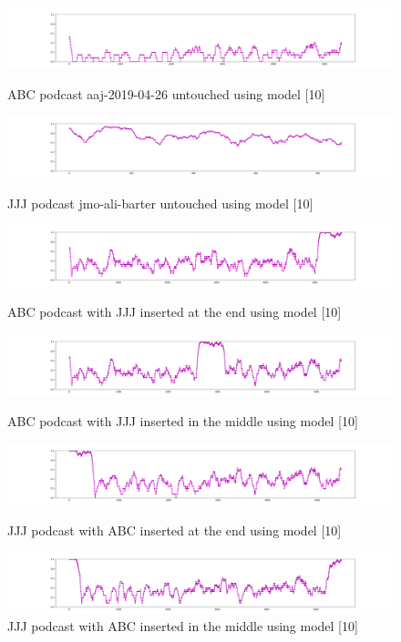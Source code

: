 \begin{figure}[b!]
\begin{center}

\includegraphics[scale=0.2]{src/main-matter/results/experiment-age/entropy/audio_aug/[10]/aaj-2019-04-26}
\caption{ABC podcast aaj-2019-04-26 untouched using model [10]}

\includegraphics[scale=0.2]{src/main-matter/results/experiment-age/entropy/audio_aug/[10]/jmo-ali-barter}
\caption{JJJ podcast jmo-ali-barter untouched using model [10]}

\includegraphics[scale=0.2]{src/main-matter/results/experiment-age/entropy/audio_aug/[10]/abc-with-end-jjj}
\caption{ABC podcast with JJJ inserted at the end using model [10]}

\includegraphics[scale=0.2]{src/main-matter/results/experiment-age/entropy/audio_aug/[10]/abc-with-middle-jjj}
\caption{ABC podcast with JJJ inserted in the middle using model [10]}

\includegraphics[scale=0.2]{src/main-matter/results/experiment-age/entropy/audio_aug/[10]/jjj-with-end-abc}
\caption{JJJ podcast with ABC inserted at the end using model [10]}

\includegraphics[scale=0.2]{src/main-matter/results/experiment-age/entropy/audio_aug/[10]/jjj-with-middle-abc}
\caption{JJJ podcast with ABC inserted in the middle using model [10]}


\label{default}
\end{center}
\end{figure}


\clearpage
